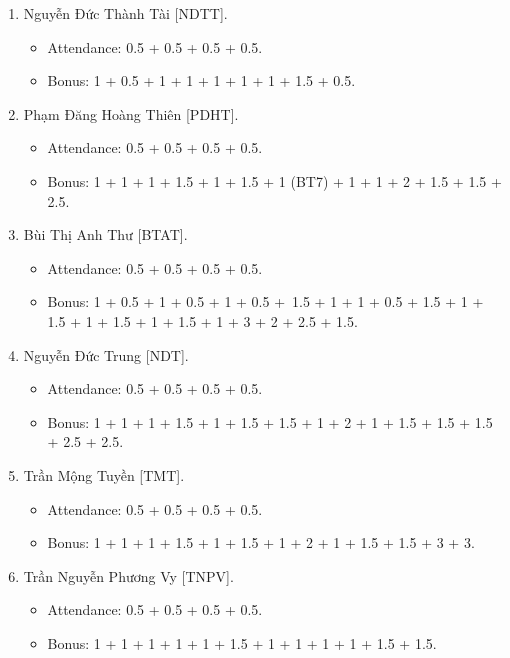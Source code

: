 \documentclass{article}
\begin{document}
\begin{enumerate}
\begin{itemize}
        \item Attendance: 0.5 + 0.5 + 0.5 + 0.5.
        \item Bonus: 1.5 + 1.5 + 1 + 2 + 1 + 1.5 + 1.5 + 3 + 2.5.
    \end{itemize}
    \item {\sc Nguyễn Đức Thành Tài [NDTT].}
    \begin{itemize}
        \item Attendance: 0.5 + 0.5 + 0.5 + 0.5.
        \item Bonus: 1 + 0.5 + 1 + 1 + 1 + 1 + 1 + 1.5 + 0.5.
    \end{itemize}
    \item {\sc Phạm Đăng Hoàng Thiên [PDHT].}
    \begin{itemize}
        \item Attendance: 0.5 + 0.5 + 0.5 + 0.5.
        \item Bonus: 1 + 1 + 1 + 1.5 + 1 + 1.5 + 1 (BT7) + 1 + 1 + 2 + 1.5 + 1.5 + 2.5.
    \end{itemize}
    \item {\sc Bùi Thị Anh Thư [BTAT].}
    \begin{itemize}
        \item Attendance: 0.5 + 0.5 + 0.5 + 0.5.
        \item Bonus: 1 + 0.5 + 1 + 0.5 + 1 + 0.5 + 1.5 + 1 + 1 + 0.5 + 1.5 + 1 + 1.5 + 1 + 1.5 + 1 + 1.5 + 1 + 3 + 2 + 2.5 + 1.5.
    \end{itemize}
    \item {\sc Nguyễn Đức Trung [NDT].}
    \begin{itemize}
        \item Attendance: 0.5 + 0.5 + 0.5 + 0.5.
        \item Bonus: 1 + 1 + 1 + 1.5 + 1 + 1.5 + 1.5 + 1 + 2 + 1 + 1.5 + 1.5 + 1.5 + 2.5 + 2.5.
    \end{itemize}
    \item {\sc Trần Mộng Tuyền [TMT].}
    \begin{itemize}
        \item Attendance: 0.5 + 0.5 + 0.5 + 0.5.
        \item Bonus: 1 + 1 + 1 + 1.5 + 1 + 1.5 + 1 + 2 + 1 + 1.5 + 1.5 + 3 + 3.
    \end{itemize}
    \item {\sc Trần Nguyễn Phương Vy [TNPV].}
    \begin{itemize}
        \item Attendance: 0.5 + 0.5 + 0.5 + 0.5.
        \item Bonus: 1 + 1 + 1 + 1 + 1 + 1.5 + 1 + 1 + 1 + 1 + 1.5 + 1.5.
    \end{itemize}
\end{enumerate}
\end{document}
